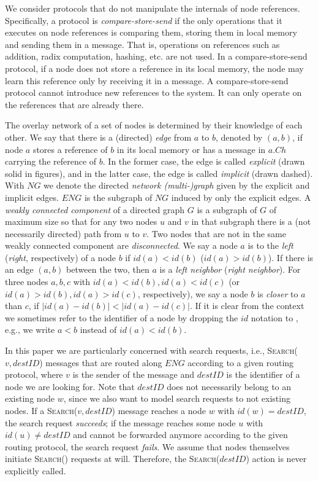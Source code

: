 \documentclass[a4paper,USenglish]{lipics}
\newcommand{\search}[1]{\textsc{Search(\ensuremath{#1})}\xspace}
\begin{document}
We consider protocols that do not manipulate the internals of node
references. Specifically, a protocol is \emph{compare-store-send} if the only
operations that it executes on node references is comparing them, storing
them in local memory and sending them in a message. That is, operations on
references such as addition, radix computation, hashing, etc. are not used. In
a compare-store-send protocol, if a node does not store a reference in its
local memory, the node may learn this reference only by receiving it in a
message. A compare-store-send protocol cannot introduce new references to the
system. It can only operate on the references that are already there.

The overlay network of a set of nodes is determined by their knowledge of each other. 
We say that there is a (directed) \emph{edge} from $a$ to $b$, denoted by $(a,b)$, if node $a$ stores a reference of $b$ in its local memory or has a message in $a.Ch$ carrying the reference of $b$. 
In the former case, the edge is called \emph{explicit} (drawn solid in figures), and in the latter case, the edge is called \emph{implicit} (drawn dashed). 
With $NG$ we denote the directed \emph{network (multi-)graph} given by the explicit and implicit edges.
$ENG$ is the subgraph of $NG$ induced by only the explicit edges. 
A \emph{weakly connected component} of a directed graph $G$ is a subgraph of $G$ of maximum size so that for any two nodes $u$ and $v$ in that subgraph there is a (not necessarily directed) path from $u$ to $v$. 
Two nodes that are not in the same weakly connected component are \emph{disconnected}.
We say a node $a$ is to the \emph{left} (\emph{right}, respectively) of a node $b$ if $id(a)<id(b)$ ($id(a)>id(b)$).
If there is an edge $(a,b)$ between the two, then $a$ is a \emph{left neighbor} (\emph{right neighbor}).
For three nodes $a,b,c$ with $id(a)<id(b), id(a)<id(c)$ (or $id(a)>id(b), id(a)>id(c)$, respectively), we say a node $b$ is \emph{closer} to $a$ than $c$, if $\vert id(a)-id(b) \vert < \vert id(a)-id(c) \vert$.
If it is clear from the context we sometimes refer to the identifier of a node by dropping the $id$ notation to , e.g., we write $a < b$ instead of $id(a)<id(b)$.

In this paper we are particularly concerned with search requests, i.e., \search{v,destID} messages that are routed along $ENG$ according to a given routing protocol, where $v$ is the sender of the message and $destID$ is the identifier of a node we are looking for.
Note that $destID$ does not necessarily belong to an existing node $w$, since we also want to model search requests to not existing nodes. 
If a \search{v,destID} message reaches a node $w$ with $id(w)=destID$, the search request \emph{succeeds}; if the message reaches some node $u$ with $id(u) \ne destID$ and cannot be forwarded anymore according to the given routing protocol, the search request \emph{fails}.
We assume that nodes themselves initiate \search{} requests at will.
Therefore, the \search{destID} action is never explicitly called.
\end{document}
